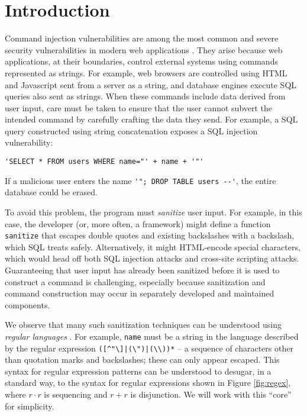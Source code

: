 \documentclass[9pt]{sig-alternate}
\theoremstyle{definition}
\begin{document}
\section{Introduction}\label{intro}
Command injection vulnerabilities are among the most common and severe security vulnerabilities in modern web applications \cite{OWASP}. They arise because web applications, at their boundaries, control external systems using commands represented as  strings. For example, web browsers are controlled using HTML and Javascript sent from a server as a string, and database engines execute SQL queries also sent as strings. When these commands include data derived from user input, care must be taken to ensure that the user cannot  subvert the intended command by carefully crafting the data they send. For example, a  SQL query constructed using string concatenation exposes a SQL injection vulnerability: 
\begin{lstlisting}[numbers=none]
'SELECT * FROM users WHERE name="' + name + '"'
\end{lstlisting}
If a malicious user enters the name \lstinline{'"; DROP TABLE users --'}, the entire database could be erased. 

To avoid this problem, the program must \emph{sanitize} user input. For example, in this case, the developer (or, more often, a framework) might define a function \verb|sanitize| that escapes double quotes and existing backslashes   with a backslash, which SQL treats safely. Alternatively, it might HTML-encode special characters, which would head off both SQL injection attacks and cross-site scripting attacks. Guaranteeing that user input has already been sanitized  before it is used to construct a command is challenging, especially because  sanitization and command construction may occur in separately developed and maintained components. %

We observe that many such sanitization techniques can be understood using \emph{regular languages} \cite{cinderella}. For example, \verb|name| must be a string in the language described by the regular expression \verb!([^"\]|(\")|(\\))*! -- a sequence of characters other than quotation marks and backslashes; these can only appear escaped. This syntax for regular expression patterns can be understood to desugar, in a standard way, to the syntax for regular expressions shown in Figure \ref{fig:regex}, where $r \cdot r$ is sequencing and $r + r$ is  disjunction. We will work with this ``core'' for simplicity.
\end{document}
